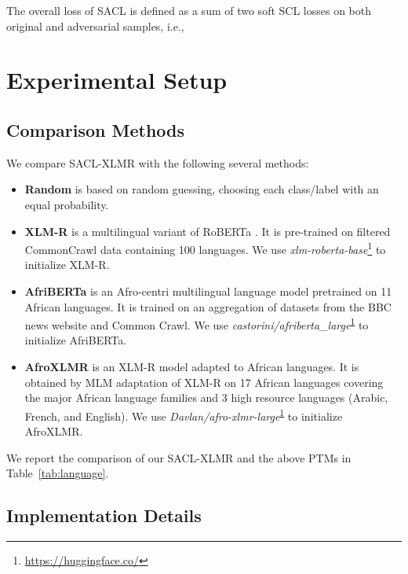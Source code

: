 \documentclass[11pt]{article}
\begin{document}
The overall loss of SACL is defined as a sum of two soft SCL losses on both original and adversarial samples, i.e.,



\section{Experimental Setup}
\subsection{Comparison Methods}
We compare SACL-XLMR with the following several methods:
\begin{itemize}
    \item \textbf{Random} is based on random guessing, choosing each class/label with an equal probability.
    \item \textbf{XLM-R} \citep{DBLP:conf/nips/ConneauL19} is a multilingual variant of RoBERTa \citep{DBLP:journals/corr/abs-1907-11692}. It is pre-trained on filtered CommonCrawl data containing 100 languages.
    We use \textit{xlm-roberta-base}\footnote{\url{https://huggingface.co/}\label{code}} to initialize XLM-R. 
    \item \textbf{AfriBERTa} \citep{ogueji-etal-2021-small} is an Afro-centri multilingual language model pretrained on 11 African languages. 
    It is trained on an aggregation of datasets from the BBC news website and Common Crawl.
    We use \textit{castorini/afriberta\_large}\textsuperscript{\ref{code}} to initialize AfriBERTa. 
    \item \textbf{AfroXLMR} \citep{DBLP:conf/coling/AlabiAMK22} is an XLM-R model adapted to African languages. It is obtained by MLM adaptation of XLM-R on 17 African languages covering the major African language families and 3 high resource languages (Arabic, French, and English). 
    We use \textit{Davlan/afro-xlmr-large}\textsuperscript{\ref{code}} to initialize AfroXLMR. 
\end{itemize}

We report the comparison of our SACL-XLMR and the above PTMs in Table~\ref{tab:language}.


\subsection{Implementation Details}
\end{document}
